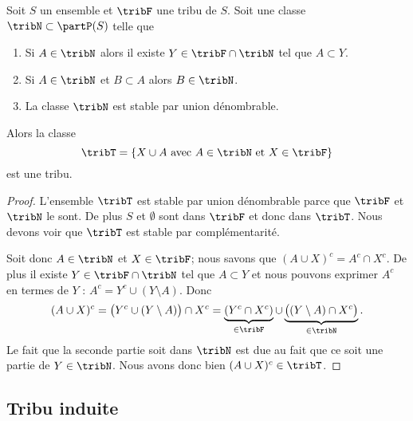 \begin{proposition}  \label{PropHYLooLgOCy}
	Soit \( S\) un ensemble et \( \tribF\) une tribu de \( S\). Soit une classe \( \tribN\subset\partP(S)\) telle que
	\begin{enumerate}
		\item
		      Si \( A\in\tribN\) alors il existe \( Y\in\tribF\cap\tribN\) tel que \( A\subset Y\).
		\item
		      Si \( A\in\tribN\) et \( B\subset A\) alors \( B\in\tribN\).
		\item
		      La classe \( \tribN\) est stable par union dénombrable.
	\end{enumerate}
	Alors la classe
	\begin{equation}
		\tribT=\{ X\cup A\text{ avec } A\in\tribN\text{ et } X\in\tribF \}
	\end{equation}
	est une tribu.
\end{proposition}

\begin{proof}
	L'ensemble \( \tribT\) est stable par union dénombrable parce que \( \tribF\) et \( \tribN\) le sont. De plus \( S\) et \( \emptyset\) sont dans \( \tribF\) et donc dans \( \tribT\). Nous devons voir que \( \tribT\) est stable par complémentarité.

	Soit donc \( A\in\tribN\) et \( X\in\tribF\); nous savons que \( (A\cup X)^c=A^c\cap X^c\). De plus il existe \( Y\in\tribF\cap\tribN\) tel que \( A\subset Y\) et nous pouvons exprimer \( A^c\) en termes de \( Y\) : \( A^c=Y^c\cup(Y\setminus A)\). Donc
	\begin{equation}
		(A\cup X)^c=\big( Y^c\cup(Y\setminus A) \big)\cap X^c=\underbrace{(Y^c\cap X^c)}_{\in\tribF}\cup\underbrace{\big( (Y\setminus A)\cap X^c \big)}_{\in\tribN}.
	\end{equation}
	Le fait que la seconde partie soit dans \( \tribN\) est due au fait que ce soit une partie de \( Y\in\tribN\). Nous avons donc bien \( (A\cup X)^c\in\tribT\).
\end{proof}

\subsection{Tribu induite}

